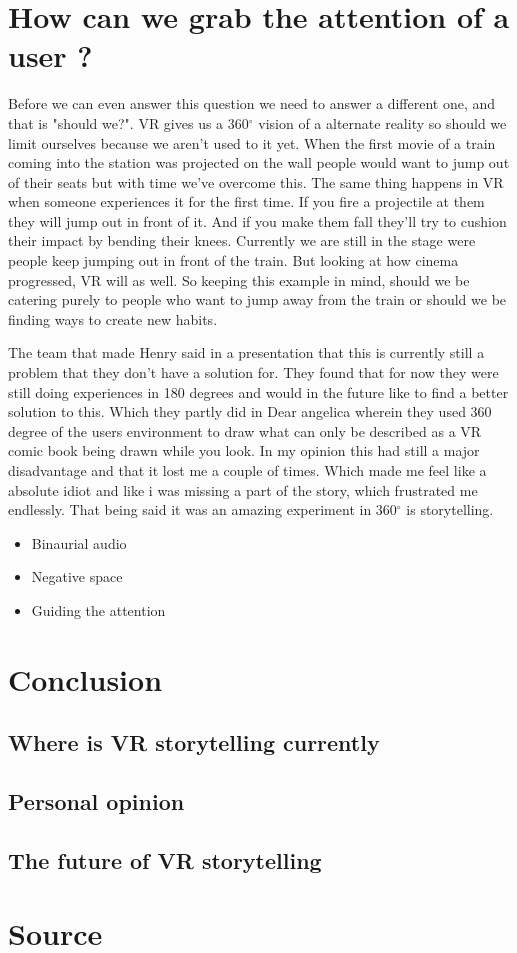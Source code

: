 \documentclass{report}
\begin{document}
				\chapter{How can we grab the attention of a user ?}
				Before we can even answer this question we need to answer a different one, and that is "should we?". VR gives us a 360$^{\circ}$ vision of a alternate reality so should we limit ourselves because we aren't used to it yet. When the first movie of a train coming into the station was projected on the wall people would want to jump out of their seats but with time we've overcome this. The same thing happens in VR when someone experiences it for the first time. If you fire a projectile at them they will jump out in front of it. And if you make them fall they'll try to cushion their impact by bending their knees. Currently we are still in the stage were people keep jumping out in front of the train. But looking at how cinema progressed, VR will as well. So keeping this example in mind, should we be catering purely to people who want to jump away from the train or should we be finding ways to create new habits.
				
				 The team that made Henry said in a presentation that this is currently still a problem that they don't have a solution for. They found that for now they were still doing experiences in 180 degrees and would in the future like to find a better solution to this. Which they partly did in Dear angelica wherein they used 360 degree of the users environment to draw what can only be described as a VR comic book being drawn while you look. In my opinion this had still a major disadvantage and that it lost me a couple of times. Which made me feel like a absolute idiot and like i was missing a part of the story, which frustrated me endlessly. That being said it was an amazing experiment in 360$^{\circ}$ is storytelling.
				
				\begin{itemize}
					\item Binaurial audio
					\item Negative space
					\item Guiding the attention
				\end{itemize}
				
				\chapter{Conclusion}
				\section{Where is VR storytelling currently}
				\section{Personal opinion}
				\section{The future of VR storytelling}
				\chapter{Source}
		
\end{document}
